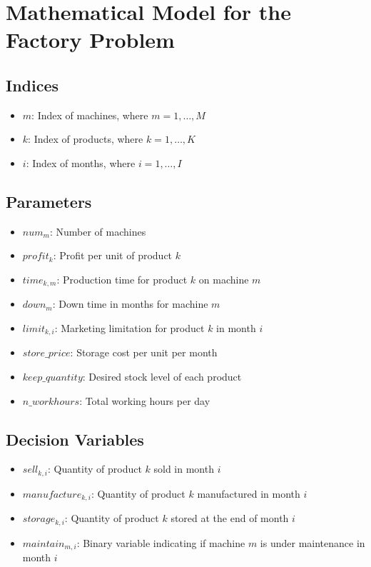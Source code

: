 \documentclass{article}
\begin{document}
\section*{Mathematical Model for the Factory Problem}

\subsection*{Indices}
\begin{itemize}
    \item $m$: Index of machines, where $m = 1, \ldots, M$
    \item $k$: Index of products, where $k = 1, \ldots, K$
    \item $i$: Index of months, where $i = 1, \ldots, I$
\end{itemize}

\subsection*{Parameters}
\begin{itemize}
    \item $num_{m}$: Number of machines
    \item $profit_{k}$: Profit per unit of product $k$
    \item $time_{k, m}$: Production time for product $k$ on machine $m$
    \item $down_{m}$: Down time in months for machine $m$
    \item $limit_{k, i}$: Marketing limitation for product $k$ in month $i$
    \item $store\_price$: Storage cost per unit per month
    \item $keep\_quantity$: Desired stock level of each product
    \item $n\_workhours$: Total working hours per day
\end{itemize}

\subsection*{Decision Variables}
\begin{itemize}
    \item $sell_{k, i}$: Quantity of product $k$ sold in month $i$
    \item $manufacture_{k, i}$: Quantity of product $k$ manufactured in month $i$
    \item $storage_{k, i}$: Quantity of product $k$ stored at the end of month $i$
    \item $maintain_{m, i}$: Binary variable indicating if machine $m$ is under maintenance in month $i$
\end{itemize}
\end{document}
